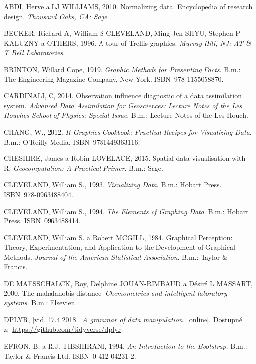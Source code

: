 \documentclass[12pt,]{article}
\begin{document}
\hypertarget{refs}{}
\hypertarget{ref-normalizing}{}
ABDI, Herve a LJ WILLIAMS, 2010. Normalizing data. Encyclopedia of
research design. \emph{Thousand Oaks, CA: Sage}.

\hypertarget{ref-trellisplot}{}
BECKER, Richard A, William S CLEVELAND, Ming-Jen SHYU, Stephen P KALUZNY
a OTHERS, 1996. A tour of Trellis graphics. \emph{Murray Hill, NJ: AT \&
T Bell Laboratories}.

\hypertarget{ref-brinton_1919}{}
BRINTON, Willard Cope, 1919. \emph{Graphic Methods for Presenting
Facts}. B.m.: The Engineering Magazine Company, New York.
ISBN~978-1155058870.

\hypertarget{ref-leverages_regression}{}
CARDINALI, C, 2014. Observation influence diagnostic of a data
assimilation system. \emph{Advanced Data Assimilation for Geosciences:
Lecture Notes of the Les Houches School of Physics: Special Issue}.
B.m.: Lecture Notes of the Les Houch.

\hypertarget{ref-chang2012}{}
CHANG, W., 2012. \emph{R Graphics Cookbook: Practical Recipes for
Visualizing Data}. B.m.: O'Reilly Media. ISBN~9781449363116.

\hypertarget{ref-spatial}{}
CHESHIRE, James a Robin LOVELACE, 2015. Spatial data visualisation with
R. \emph{Geocomputation: A Practical Primer}. B.m.: Sage.

\hypertarget{ref-cleveland1993}{}
CLEVELAND, William S., 1993. \emph{Visualizing Data}. B.m.: Hobart
Press. ISBN~978-0963488404.

\hypertarget{ref-cleveland1994}{}
CLEVELAND, William S., 1994. \emph{The Elements of Graphing Data}. B.m.:
Hobart Press. ISBN~0963488414.

\hypertarget{ref-cleveland_mcgill}{}
CLEVELAND, William S. a Robert MCGILL, 1984. Graphical Perception:
Theory, Experimentation, and Application to the Development of Graphical
Methods. \emph{Journal of the American Statistical Association}. B.m.:
Taylor \& Francis.

\hypertarget{ref-mbdist2}{}
DE MAESSCHALCK, Roy, Delphine JOUAN-RIMBAUD a Désiré L MASSART, 2000.
The mahalanobis distance. \emph{Chemometrics and intelligent laboratory
systems}. B.m.: Elsevier.

\hypertarget{ref-dplyr}{}
DPLYR, {[}vid. 17.4.2018{]}. \emph{A grammar of data manipulation.}
{[}online{]}. Dostupné z:~\url{https://github.com/tidyverse/dplyr}

\hypertarget{ref-bootstrap}{}
EFRON, B. a R.J. TIBSHIRANI, 1994. \emph{An Introduction to the
Bootstrap}. B.m.: Taylor \& Francis Ltd. ISBN~0-412-04231-2.
\end{document}
